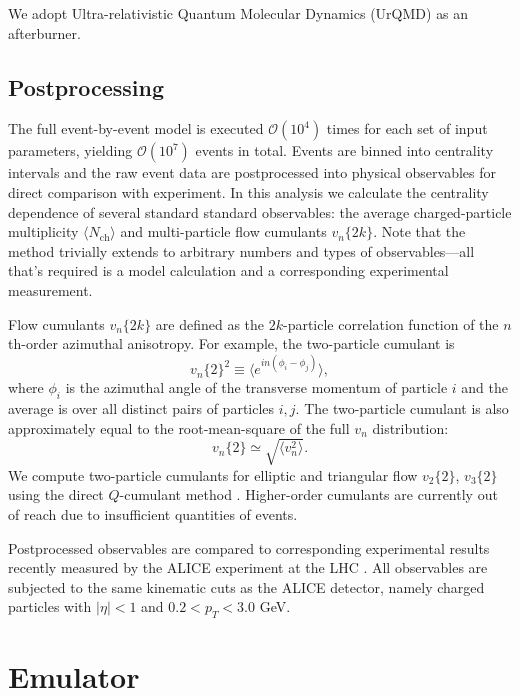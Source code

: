 \documentclass[aps,prc,reprint,superscriptaddress,amsmath]{revtex4-1}
\newcommand{\avg}[1]{\langle #1 \rangle}
\newcommand{\nch}{N_\text{ch}}
\newcommand{\vnk}[2]{v_#1\{#2\}}
\begin{document}
We adopt Ultra-relativistic Quantum Molecular Dynamics (UrQMD) \cite{Bass:1998ca,Bleicher:1999xi} as an afterburner.

\subsection{Postprocessing}

The full event-by-event model is executed $\mathcal O(10^4)$ times for each set of input parameters, yielding $\mathcal O(10^7)$ events in total.
Events are binned into centrality intervals and the raw event data are postprocessed into physical observables for direct comparison with experiment.
In this analysis we calculate the centrality dependence of several standard standard observables:
the average charged-particle multiplicity $\avg\nch$ and multi-particle flow cumulants $\vnk n {2k}$.
Note that the method trivially extends to arbitrary numbers and types of observables---all that's required is a model calculation and a corresponding experimental measurement.

Flow cumulants $\vnk n {2k}$ are defined as the $2k$-particle correlation function of the $n$th-order azimuthal anisotropy.
For example, the two-particle cumulant is
\begin{equation}
  \vnk n 2^2 \equiv \bigl\langle e^{in(\phi_i - \phi_j)} \bigr\rangle,
\end{equation}
where $\phi_i$ is the azimuthal angle of the transverse momentum of particle $i$ and the average is over all distinct pairs of particles $i,j$.
The two-particle cumulant is also approximately equal to the root-mean-square of the full $v_n$ distribution:
\begin{equation}
  \vnk n 2 \simeq \sqrt{\avg{v_n^2}}.
\end{equation}
We compute two-particle cumulants for elliptic and triangular flow $\vnk 2 2$, $\vnk 3 2$ using the direct $Q$-cumulant method \cite{Bilandzic:2010jr}.
Higher-order cumulants are currently out of reach due to insufficient quantities of events.

Postprocessed observables are compared to corresponding experimental results recently measured by the ALICE experiment at the LHC \cite{Abelev:2014mda}.
All observables are subjected to the same kinematic cuts as the ALICE detector, namely charged particles with $|\eta| < 1$ and $0.2 < p_T < 3.0$ GeV.


\section{Emulator}
\end{document}
